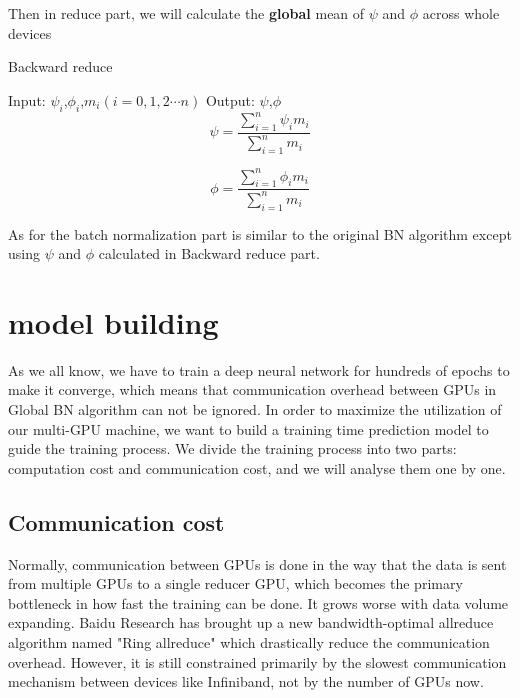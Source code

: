 Then in reduce part, we will calculate the \textbf{global} mean of $\psi$ and $\phi$ across whole devices

\begin{algorithm}
    \caption{Backward reduce}
    \label{alg:backward-reduce}
    \begin{algorithmic}[1]
        \State Input: $\psi_{i}$,$\phi_{i}$,$m_{i}$$(i = 0,1,2\cdots n)$
        \State Output: $\psi$,$\phi$
        \begin{equation}
            {\psi} = {\frac{ \sum_{i=1}^{n} {\psi_{i}} {m_{i}} }{\sum_{i=1}^{n} {m_{i}}}}
        \end{equation}

        \begin{equation}
            {\phi} = {\frac{ \sum_{i=1}^{n} {\phi_{i}} {m_{i}} }{ \sum_{i=1}^{n} {m_{i}}}}
        \end{equation}
    \end{algorithmic}
\end{algorithm}


As for the batch normalization part is similar to the original BN algorithm except using $\psi$ and $\phi$ calculated in Backward reduce part.


\section{model building}

As we all know, we have to train a deep neural network for hundreds of epochs to make it converge, which means that communication overhead between GPUs in Global BN algorithm can not be ignored. In order to maximize the utilization of our multi-GPU machine, we want to build a training time prediction model to guide the training process. We divide the training process into two parts: computation cost and communication cost, and we will analyse them one by one.


\subsection{Communication cost}

Normally, communication between GPUs is done in the way that the data is sent from multiple GPUs to a single reducer GPU, which becomes the primary bottleneck in how fast the training can be done. It grows worse with data volume expanding. Baidu Research has brought up a new bandwidth-optimal allreduce algorithm named "Ring allreduce"\cite{baidu-allreduce} which drastically reduce the communication overhead. However, it is still constrained primarily by the slowest communication mechanism between devices like Infiniband, not by the number of GPUs now.

